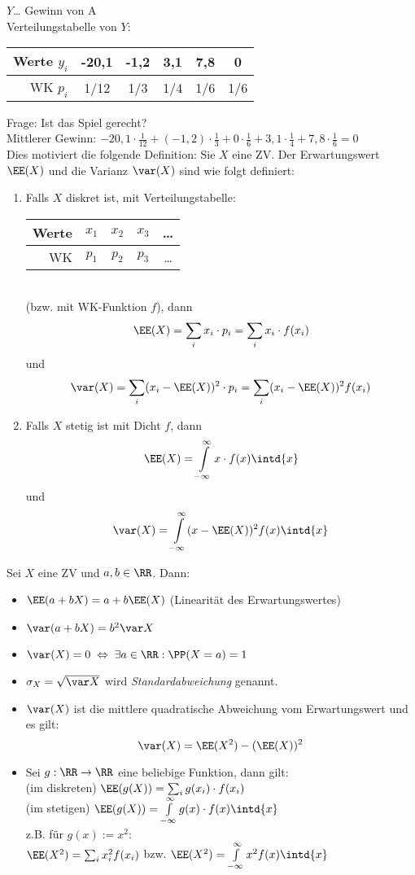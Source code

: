 \documentclass{scrreprt}
\renewenvironment{anumerate}{\begin{enumerate}[label=(\alph*)]}{\end{enumerate}} %
\begin{document}
$Y$… Gewinn von A\\
Verteilungstabelle von $Y$:\\
\begin{tabular}{r | c | c | c | c | c}
Werte $y_i$ & -20,1 & -1,2 & 3,1 & 7,8 & 0\\\hline 
WK $p_i$ & 1/12 & 1/3 & 1/4 & 1/6 & 1/6
\end{tabular}

Frage: Ist das Spiel gerecht?\\
Mittlerer Gewinn: $-20,1 \cdot \frac{1}{12} + (-1,2) \cdot \frac{1}{3}+ 0\cdot \frac{1}{6} + 3,1 \cdot \frac{1}{4} + 7,8 \cdot \frac{1}{6} = 0$\\
Dies motiviert die folgende Definition:
 Sie $X$ eine ZV. Der Erwartungswert $\EE(X)$ und die Varianz $\var(X)$ sind wie folgt definiert:
\begin{anumerate}
\item Falls $X$ diskret ist, mit Verteilungstabelle:\\
\begin{tabular}{r | c c c c}
Werte & $x_1$ & $x_2$ & $x_3$ & …\\\hline
WK & $p_1$ & $p_2$ & $p_3$ & …
\end{tabular}\\
(bzw. mit WK-Funktion $f$), dann 
$$\EE(X) = \sum_i x_i \cdot p_i = \sum_i x_i \cdot f(x_i)$$
und
$$\var(X)=\sum_i (x_i - \EE(X))^2 \cdot p_i = \sum_i (x_i - \EE(X))^2 f(x_i)$$
\item Falls $X$ stetig ist mit Dicht $f$, dann
$$\EE(X) = \int\limits_{-\infty}^{\infty} x\cdot f(x) \intd{x}$$
und 
$$\var (X) = \int\limits_{-\infty}^{\infty} (x-\EE(X))^2 f(x) \intd{x}$$
\end{anumerate}

 Sei $X$ eine ZV und $a, b \in \RR$. Dann:
\begin{itemize}
\item $\EE(a+bX)=a+b\EE(X)$ \tab (Linearität des Erwartungswertes)
\item $\var(a+bX) = b^2 \var X$
\item $\var(X)=0 \;\Leftrightarrow\; \exists a \in \RR: \PP(X=a) =1$
\end{itemize}

\begin{itemize}
\item $\sigma_X=\sqrt{\var X}$ wird \emph{Standardabweichung} genannt.
\item $\var (X)$ ist die mittlere quadratische Abweichung vom Erwartungswert und es gilt:
$$\var (X) = \EE(X^2) - (\EE(X))^2$$
\item Sei $g: \RR \to \RR$ eine beliebige Funktion, dann gilt: \\
(im diskreten) \tab\tab $\EE(g(X))=\sum_i g(x_i) \cdot f(x_i)$\bigskip\\
(im stetigen) \tab\tab $\EE(g(X))=\int\limits_{-\infty}^{\infty} g(x) \cdot f(x) \intd{x}$\\
z.B. für $g(x):=x^2$:\\
$\EE(X^2) = \sum_i x_i^2 f(x_i)$ bzw. $\EE(X^2) = \int\limits_{-\infty}^{\infty}x^2 f(x) \intd{x}$
\end{itemize}
\end{document}
